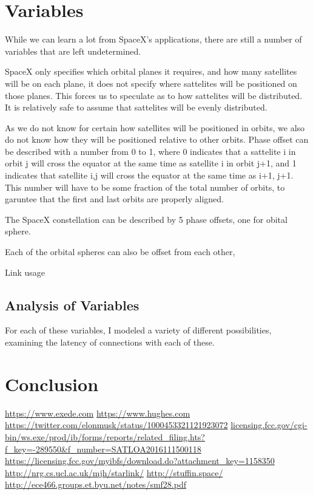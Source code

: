 \documentclass[12pt]{article}
\begin{document}
\section{Variables}
While we can learn a lot from SpaceX's applications, there are still a number of variables that are left undetermined. 

\begin{description}
\item[Distribution on Orbit]
SpaceX only specifies which orbital planes it requires, and how many satellites will be on each plane, it does not specify where sattelites will be positioned on those planes. This forces us to speculate as to how sattelites will be distributed. It is relatively safe to assume that sattelites will be evenly distributed.
	
\item[Phase Offset]
As we do not know for certain how satellites will be positioned in orbits, we also do not know how they will be positioned relative to other orbits. Phase offset can be described with a number from 0 to 1, where 0 indicates that a sattelite i in orbit j will cross the equator at the same time as satellite i in orbit j+1, and 1 indicates that satellite i,j will cross the equator at the same time as i+1, j+1. This number will have to be some fraction of the total number of orbits, to garuntee that the first and last orbits are properly aligned.

The SpaceX constellation can be described by 5 phase offsets, one for obital sphere.

Each of the orbital spheres can also be offset from each other,

\item{Link usage}


\end{description}

\subsection{Analysis of Variables}
For each of these variables, I modeled a variety of different possibilities, examining the latency of connections with each of these.

\section{Conclusion}


\begin{thebibliography}{9}
	 \url{https://www.exede.com}
	 \url{https://www.hughes.com}
	 \url{https://twitter.com/elonmusk/status/1000453321121923072}
	 \url{licensing.fcc.gov/cgi-bin/ws.exe/prod/ib/forms/reports/related_filing.hts?f_key=-289550&f_number=SATLOA2016111500118}
	 \url{https://licensing.fcc.gov/myibfs/download.do?attachment_key=1158350}
	 \url{http://nrg.cs.ucl.ac.uk/mjh/starlink/}
	 \url{http://stuffin.space/}
	 \url{http://ece466.groups.et.byu.net/notes/smf28.pdf}
\end{thebibliography}
\end{document}

